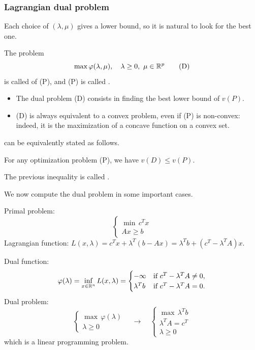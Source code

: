 \subsubsection{Lagrangian dual problem}

Each choice of $(\lambda, \mu)$ gives a lower bound, so it is natural to look for the best one.

\begin{definition}
    The problem
    \[
        \max \varphi(\lambda, \mu), \quad \lambda \ge 0,\ \mu \in \mathbb{R}^p \tag{D}
    \]
    is called  of (P), and (P) is called .
\end{definition}

\begin{itemize}
    \item The dual problem (D) consists in finding the best lower bound of $v(P)$.
    \item (D) is always equivalent to a convex problem, even if (P) is non-convex: indeed, it is the maximization of a concave function on a convex set.
\end{itemize}

 can be equivalently stated as follows.

\begin{theorem}
    For any optimization problem (P), we have $v(D) \le v(P)$.
\end{theorem}

The previous inequality is called .

We now compute the dual problem in some important cases.

\begin{example}
    Primal problem:
    \[
        \begin{cases}
            \min\, c^Tx\\
            Ax \ge b
        \end{cases} \tag{P}
    \]
    Lagrangian function: $L(x, \lambda) = c^Tx + \lambda^T(b - Ax) = \lambda^Tb + (c^T - \lambda^TA)x$.

    Dual function:
    \[
        \varphi(\lambda) = \inf_{x \in \mathbb{R}^n} L(x, \lambda) =
        \begin{cases}
            -\infty & \text{if } c^T - \lambda^TA \neq 0,\\
            \lambda^Tb & \text{if } c^T - \lambda^TA = 0.
        \end{cases}
    \]
    Dual problem:
    \[
        \begin{cases}
            \max\, \varphi(\lambda)\\
            \lambda \ge 0
        \end{cases}
        \quad \longrightarrow \quad
        \begin{cases}
            \max\, \lambda^Tb\\
            \lambda^TA = c^T\\
            \lambda \ge 0
        \end{cases} \tag{D}
    \]
    which is a linear programming problem.
\end{example}

